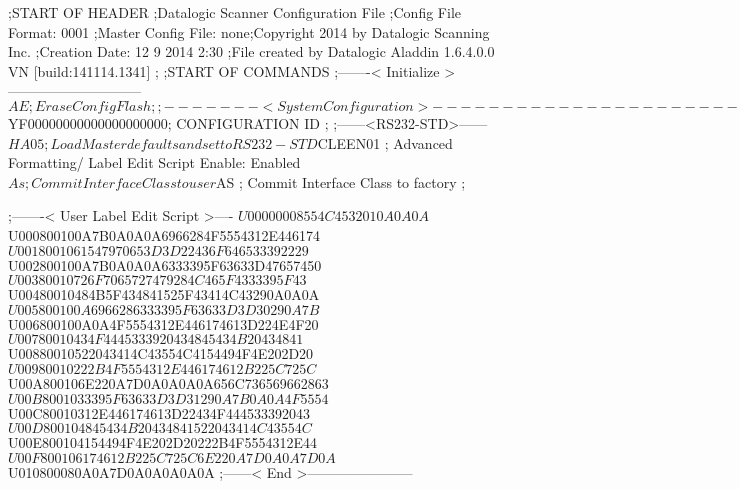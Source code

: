 ;START OF HEADER
;Datalogic Scanner Configuration File
;Config File Format: 0001
;Master Config File: none;Copyright 2014 by Datalogic Scanning Inc.
;Creation Date: 12 9 2014 2:30
;File created by Datalogic Aladdin 1.6.4.0.0 VN [build:141114.1341]
;
;START OF COMMANDS
;-------< Initialize >-----------------------------
$AE                 ; Erase Config Flash
;
;-------< System Configuration >-------------------------------
$YF00000000000000000000; CONFIGURATION ID
;
;------<RS232-STD>------
$HA05               ; Load Master defaults and set to RS232-STD
$CLEEN01            ; Advanced Formatting/ Label Edit Script Enable: Enabled
$As                 ; Commit Interface Class to user
$AS                 ; Commit Interface Class to factory
;

;-------< User Label Edit Script >----
$U00000008554C4532010A0A0A
$U000800100A7B0A0A0A6966284F5554312E446174
$U0018001061547970653D3D22436F646533392229
$U002800100A7B0A0A0A6333395F63633D47657450
$U00380010726F7065727479284C465F4333395F43
$U00480010484B5F434841525F43414C43290A0A0A
$U005800100A6966286333395F63633D3D30290A7B
$U006800100A0A4F5554312E446174613D224E4F20
$U00780010434F4445333920434845434B20434841
$U00880010522043414C43554C4154494F4E202D20
$U00980010222B4F5554312E446174612B225C725C
$U00A800106E220A7D0A0A0A0A656C736569662863
$U00B8001033395F63633D3D31290A7B0A0A4F5554
$U00C80010312E446174613D22434F444533392043
$U00D800104845434B20434841522043414C43554C
$U00E800104154494F4E202D20222B4F5554312E44
$U00F800106174612B225C725C6E220A7D0A0A7D0A
$U010800080A0A7D0A0A0A0A0A
;------< End >-----------------------
